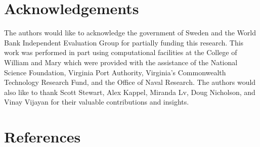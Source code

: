 \documentclass{article}\usepackage[]{graphicx}\usepackage[]{color}
\newenvironment{knitrout}{}{}  %
\begin{document}
\begin{knitrout}
\section{Acknowledgements}
The authors would like to acknowledge the government of Sweden and the World Bank Independent Evaluation Group for partially funding this research.  This work was performed in part using computational facilities at the College of William and Mary which were provided with the assistance of the National Science Foundation, Virginia Port Authority, Virginia's Commonwealth Technology Research Fund, and the Office of Naval Research.  The authors would also like to thank Scott Stewart, Alex Kappel, Miranda Lv, Doug Nicholson, and Vinay Vijayan for their valuable contributions and insights.


\newpage
\section{References}
\printbibliography



\end{knitrout}
\end{document}
